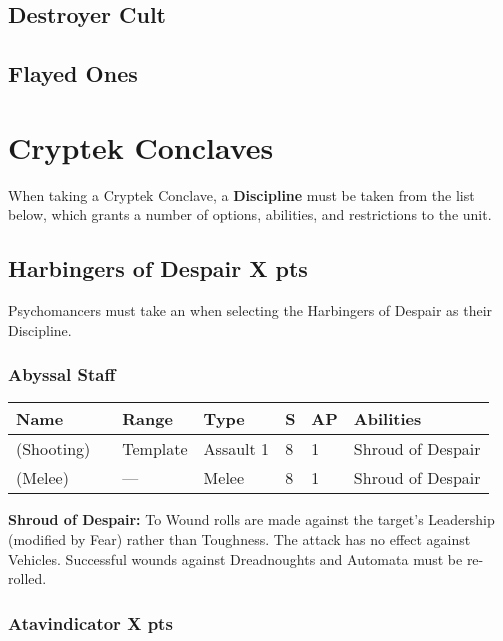 \subsection{Destroyer Cult}

\subsection{Flayed Ones}


\section{Cryptek Conclaves}

When taking a Cryptek Conclave, a \textbf{Discipline} must be taken from the list below, which grants a number of options, abilities, and restrictions to the unit.

\subsection[Harbingers of Despair ]{Harbingers of Despair  \hrulefill X pts}

Psychomancers must take an  when selecting the Harbingers of Despair as their Discipline.

\subsubsection{Abyssal Staff}
\label{Abyssal Staff}
\noindent
\begin{tabular}{||m{130pt} m{10pt} m{31pt} m{55pt} m{12pt} m{12pt} m{210pt}||}
	\hline
	Name & & Range & Type & S & AP & Abilities \\
	\hline
	\quickref{Abyssal Staff} (Shooting) & & Template & Assault 1 & 8 & 1 & Shroud of Despair \\
	\quickref{Abyssal Staff} (Melee) & & — & Melee & 8 & 1 & Shroud of Despair \\
	\hline
\end{tabular}

\textbf{Shroud of Despair:} To Wound rolls are made against the target's Leadership (modified by Fear) rather than Toughness. The attack has no effect against Vehicles. Successful wounds against Dreadnoughts and Automata must be re-rolled.

\subsubsection[Atavindicator ]{Atavindicator  \hrulefill X pts}

